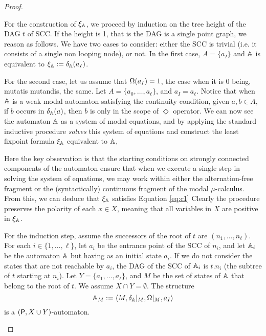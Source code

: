 \begin{proof}
\begin{pfclaim}
For the construction of $\xi_\mathbb{A}$, we proceed by induction on the tree height of the DAG $t$ of SCC. If the height is 1, that is the DAG is a single point graph, we reason as follows.
 We have two cases to consider: either the SCC is trivial (i.e. it consists of a single non looping node), or not.
In the first case, $A=\{a_I\}$ and $\mathbb{A}$ is equivalent to $\xi_\mathbb{A}:=\delta_\mathbb{A}(a_I)$.

For the second case, let us assume that $\Omega(a_I)=1$, the case when it is $0$ being, mutatis mutandis, the same.
Let $A=\{a_0, \dots, a_\ell\}$, and $a_I=a_\ell$.
Notice that when $\mathbb{A}$ is a weak modal automaton {\color{red} satisfying the continuity condition, given $a,b \in A$, if $b$ occurs in $\delta_\mathbb{A}(a)$, then $b$ is only in the scope of $\Diamond$ operator.} 
We can now see the automaton $\mathbb{A}$
as a system of modal equations, and by applying the standard inductive procedure \emph{solves} this system of equations and
construct the least fixpoint formula $\xi_\mathbb{A}$ equivalent to $\mathbb{A}$, 

Here the key observation is that the starting conditions on
strongly connected components of the automaton ensure that when we execute
a single step in solving the system of equations, we 
may work within either the alternation-free fragment or the
(syntactically) continuous fragment of the modal $\mu$-calculus.
From this, we can deduce that $\xi_\mathbb{A}$ satisfies Equation \ref{eq:c1}
 Clearly the procedure preserves the polarity of each $x \in X$, meaning that all variables in $X$ are positive in $\xi_\mathbb{A}$.


For the induction step, assume the successors of the root of $t$ are $(n_1, \dots, n_\ell)$. For each $i \in \{1,\dots,\ell\}$, let $a_i$ be the entrance point of the SCC of $n_i$, and let $\mathbb{A}_{i}$ be the automaton $\mathbb{A}$ but having as an initial state $a_i$. If we do not consider the states that are not reachable by $a_i$, the DAG of the SCC of $\mathbb{A}_{i}$ is $t.{n_i}$ (the subtree of $t$ starting at $n_i$).
Let $Y=\{a_1, \dots, a_\ell\}$, and $M$ be the set of states of $\mathbb{A}$ that belong to the root of $t$. We assume $X \cap Y = \emptyset$. The structure
\[
\aut_M := \tup{M, \delta_\aut|_{M}, \pmap|_{M}, a_I}
\] is a $(\mathsf{P}, X \cup Y)$-automaton.


\end{pfclaim}
\end{proof}
